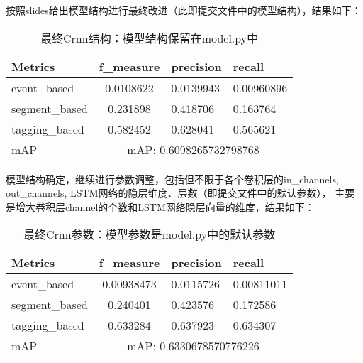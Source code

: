 \documentclass[]{ctexart}
\begin{document}
\newpage
按照slides给出模型结构进行最终改进（此即提交文件中的模型结构），结果如下：
\begin{table}[ht]
    \centering
    \begin{tabular}{|l|cll|}
    \hline
    Metrics        & \multicolumn{1}{c|}{f\_measure} & \multicolumn{1}{l|}{precision}  & recall     \\ \hline
    event\_based   & \multicolumn{1}{c|}{0.0108622}  & \multicolumn{1}{l|}{0.0139943}  & 0.00960896 \\ \hline
    segment\_based & \multicolumn{1}{c|}{0.231898}   & \multicolumn{1}{l|}{0.418706}   & 0.163764   \\ \hline
    tagging\_based & \multicolumn{1}{c|}{0.582452}   & \multicolumn{1}{l|}{0.628041}   & 0.565621   \\ \hline
    mAP            & \multicolumn{3}{c|}{mAP: 0.6098265732798768}                                        \\ \hline
    \end{tabular}
    \caption{最终Crnn结构：模型结构保留在model.py中}
    \label{exp3}
\end{table}

模型结构确定，继续进行参数调整，包括但不限于各个卷积层的in\_channels, out\_channels, LSTM网络的隐层维度、层数（即提交文件中的默认参数），
主要是增大卷积层channel的个数和LSTM网络隐层向量的维度，结果如下：
\begin{table}[ht]
    \centering
    \begin{tabular}{|l|cll|}
    \hline
    Metrics        & \multicolumn{1}{c|}{f\_measure} & \multicolumn{1}{l|}{precision}  & recall     \\ \hline
    event\_based   & \multicolumn{1}{c|}{0.00938473} & \multicolumn{1}{l|}{0.0115726}  & 0.00811011 \\ \hline
    segment\_based & \multicolumn{1}{c|}{0.240401}   & \multicolumn{1}{l|}{0.423576}   & 0.172586   \\ \hline
    tagging\_based & \multicolumn{1}{c|}{0.633284}   & \multicolumn{1}{l|}{0.637923}   & 0.634307   \\ \hline
    mAP            & \multicolumn{3}{c|}{mAP: 0.6330678570776226}                                        \\ \hline
    \end{tabular}
    \caption{最终Crnn参数：模型参数是model.py中的默认参数}
    \label{exp4}
\end{table}
\end{document}
